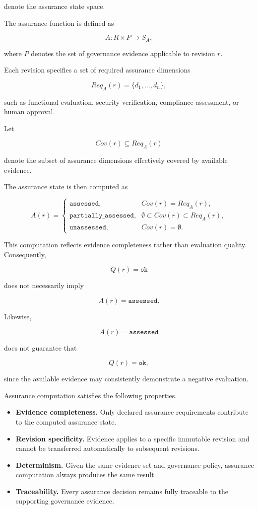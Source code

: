 \documentclass[10pt]{article}
\begin{document}
denote the assurance state space.

The assurance function is defined as

\[
A:R\times P\rightarrow S_A,
\]

where \(P\) denotes the set of governance evidence applicable to revision \(r\).

Each revision specifies a set of required assurance dimensions

\[
Req_A(r)
=
\{
d_1,\ldots,d_n
\},
\]

such as functional evaluation, security verification, compliance assessment, or human approval.

Let

\[
Cov(r)
\subseteq
Req_A(r)
\]

denote the subset of assurance dimensions effectively covered by available evidence.

The assurance state is then computed as

\[
A(r)=
\begin{cases}
\texttt{assessed},
&
Cov(r)=Req_A(r),
\\[2mm]
\texttt{partially\_assessed},
&
\emptyset
\subset
Cov(r)
\subset
Req_A(r),
\\[2mm]
\texttt{unassessed},
&
Cov(r)=\emptyset.
\end{cases}
\]

This computation reflects evidence completeness rather than evaluation quality. Consequently,

\[
Q(r)=\texttt{ok}
\]

does not necessarily imply

\[
A(r)=\texttt{assessed}.
\]

Likewise,

\[
A(r)=\texttt{assessed}
\]

does not guarantee that

\[
Q(r)=\texttt{ok},
\]

since the available evidence may consistently demonstrate a negative evaluation.

Assurance computation satisfies the following properties.

\begin{itemize}

\item \textbf{Evidence completeness.}
Only declared assurance requirements contribute to the computed assurance state.

\item \textbf{Revision specificity.}
Evidence applies to a specific immutable revision and cannot be transferred automatically to subsequent revisions.

\item \textbf{Determinism.}
Given the same evidence set and governance policy, assurance computation always produces the same result.

\item \textbf{Traceability.}
Every assurance decision remains fully traceable to the supporting governance evidence.

\end{itemize}
\end{document}

